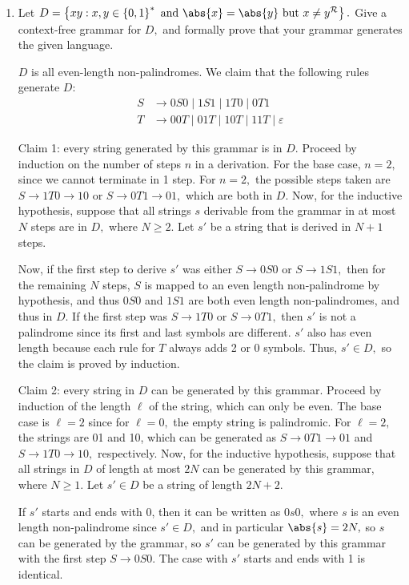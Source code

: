 \documentclass{article}
\begin{document}
\begin{enumerate}
		\newpage
	\item Let $D=\left\{ xy:x, y\in\left\{ 0, 1 \right\}^* \text{ and }\abs{x}=\abs{y}\text{ but }x\neq y^{\mathcal R} \right\}.$ Give a context-free grammar for $D,$ and formally prove that your grammar generates the given language.
		\begin{soln}
			$D$ is all even-length non-palindromes. We claim that the following rules generate $D:$
			\begin{align*}
				S &\to 0S0 \mid 1S1 \mid 1T0 \mid 0T1 \\
				T &\to 00T\mid 01T\mid 10T\mid 11T\mid \varepsilon
			\end{align*}

			Claim 1: every string generated by this grammar is in $D.$ Proceed by induction on the number of steps $n$ in a derivation.  For the base case, $n=2,$ since we cannot terminate in 1 step. For $n=2,$ the possible steps taken are $S\to 1T0\to 10$ or $S\to 0T1\to 01,$ which are both in $D.$ Now, for the inductive hypothesis, suppose that all strings $s$ derivable from the grammar in at most $N$ steps are in $D,$ where $N\ge 2.$ Let $s'$ be a string that is derived in $N+1$ steps. 

			Now, if the first step to derive $s'$ was either $S\to 0S0$ or $S\to 1S1,$ then for the remaining $N$ steps, $S$ is mapped to an even length non-palindrome by hypothesis, and thus $0S0$ and $1S1$ are both even length non-palindromes, and thus in $D.$ If the first step was $S\to 1T0$ or $S\to 0T1,$ then $s'$ is not a palindrome since its first and last symbols are different. $s'$ also has even length because each rule for $T$ always adds 2 or 0 symbols. Thus, $s'\in D,$ so the claim is proved by induction.

			Claim 2: every string in $D$ can be generated by this grammar. Proceed by induction of the length $\ell$ of the string, which can only be even. The base case is $\ell=2$ since for $\ell=0,$ the empty string is palindromic. For $\ell=2,$ the strings are 01 and 10, which can be generated as $S\to 0T1\to 01$ and $S\to 1T0\to 10,$ respectively. Now, for the inductive hypothesis, suppose that all strings in $D$ of length at most $2N$ can be generated by this grammar, where $N\ge 1.$ Let $s'\in D$ be a string of length $2N+2.$

			If $s'$ starts and ends with 0, then it can be written as $0s0,$ where $s$ is an even length non-palindrome since $s'\in D,$ and in particular $\abs{s}= 2N,$ so $s$ can be generated by the grammar, so $s'$ can be generated by this grammar with the first step $S\to 0S0.$ The case with $s'$ starts and ends with 1 is identical.


\end{soln}
\end{enumerate}
\end{document}
